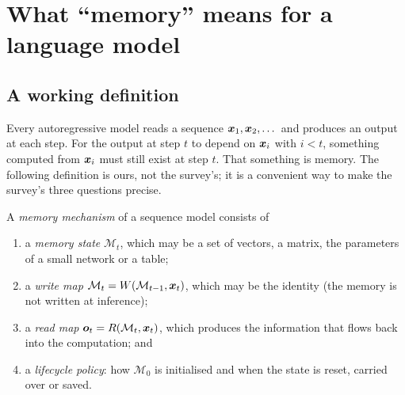 \section{What ``memory'' means for a language model}\label{sec:c02-what}

\subsection{A working definition}\label{sec:c02-definition}

Every autoregressive model reads a sequence $\bm{x}_1, \bm{x}_2, \dots$ and produces an output at each
step. For the output at step $t$ to depend on $\bm{x}_i$ with $i < t$, something computed from
$\bm{x}_i$ must still exist at step $t$. That something is memory. The following definition is ours,
not the survey's; it is a convenient way to make the survey's three questions precise.

\begin{definition}\label{def:c02-memory}
A \emph{memory mechanism} of a sequence model consists of
\begin{enumerate}[label=(\roman*)]
  \item a \emph{memory state} $\mathcal{M}_t$, which may be a set of vectors, a matrix, the
        parameters of a small network or a table;
  \item a \emph{write map} $\mathcal{M}_t = W(\mathcal{M}_{t-1}, \bm{x}_t)$, which may be the
        identity (the memory is not written at inference);
  \item a \emph{read map} $\bm{o}_t = R(\mathcal{M}_t, \bm{x}_t)$, which produces the information
        that flows back into the computation; and
  \item a \emph{lifecycle policy}: how $\mathcal{M}_0$ is initialised and when the state is
        reset, carried over or saved.
\end{enumerate}
\end{definition}

